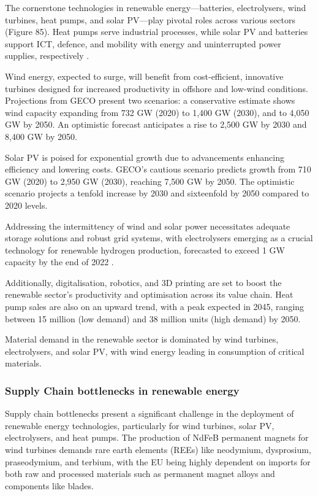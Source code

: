 The cornerstone technologies in renewable energy—batteries, electrolysers, wind turbines, heat pumps, and solar PV—play pivotal roles across various sectors (Figure 85). Heat pumps serve industrial processes, while solar PV and batteries support ICT, defence, and mobility with energy and uninterrupted power supplies, respectively \cite{jrc2023supplychain}.

Wind energy, expected to surge, will benefit from cost-efficient, innovative turbines designed for increased productivity in offshore and low-wind conditions. Projections from GECO present two scenarios: a conservative estimate shows wind capacity expanding from 732 GW (2020) to 1,400 GW (2030), and to 4,050 GW by 2050. An optimistic forecast anticipates a rise to 2,500 GW by 2030 and 8,400 GW by 2050.

Solar PV is poised for exponential growth due to advancements enhancing efficiency and lowering costs. GECO's cautious scenario predicts growth from 710 GW (2020) to 2,950 GW (2030), reaching 7,500 GW by 2050. The optimistic scenario projects a tenfold increase by 2030 and sixteenfold by 2050 compared to 2020 levels.

Addressing the intermittency of wind and solar power necessitates adequate storage solutions and robust grid systems, with electrolysers emerging as a crucial technology for renewable hydrogen production, forecasted to exceed 1 GW capacity by the end of 2022 \cite{iea2022renewables}.

Additionally, digitalisation, robotics, and 3D printing are set to boost the renewable sector's productivity and optimisation across its value chain. Heat pump sales are also on an upward trend, with a peak expected in 2045, ranging between 15 million (low demand) and 38 million units (high demand) by 2050.

Material demand in the renewable sector is dominated by wind turbines, electrolysers, and solar PV, with wind energy leading in consumption of critical materials.


\subsubsection{Supply Chain bottlenecks in renewable energy}

Supply chain bottlenecks present a significant challenge in the deployment of renewable energy technologies, particularly for wind turbines, solar PV, electrolysers, and heat pumps. The production of NdFeB permanent magnets for wind turbines demands rare earth elements (REEs) like neodymium, dysprosium, praseodymium, and terbium, with the EU being highly dependent on imports for both raw and processed materials such as permanent magnet alloys and components like blades.

